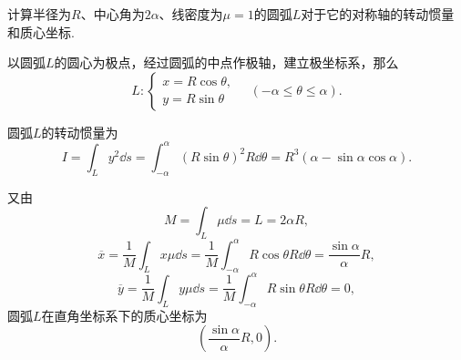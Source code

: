 \begin{example}
计算半径为\(R\)、中心角为\(2\alpha\)、线密度为\(\mu=1\)的圆弧\(L\)对于它的对称轴的转动惯量和质心坐标.
\begin{solution}
以圆弧\(L\)的圆心为极点，经过圆弧的中点作极轴，建立极坐标系，那么\begin{equation*}
	L: \left\{ \begin{array}{l}
		x = R\cos\theta, \\
		y = R\sin\theta
	\end{array} \right.
	\quad(-\alpha\leq\theta\leq\alpha).
\end{equation*}

圆弧\(L\)的转动惯量为\begin{equation*}
	I = \int_L y^2 \dd{s}
	= \int_{-\alpha}^\alpha (R\sin\theta)^2 R\dd{\theta}
	= R^3 (\alpha - \sin\alpha \cos\alpha).
\end{equation*}

又由\begin{equation*}
	M = \int_L \mu \dd{s} = L = 2\alpha R,
\end{equation*}\begin{equation*}
	\overline{x}
	= \frac{1}{M} \int_L x \mu \dd{s}
	= \frac{1}{M} \int_{-\alpha}^\alpha R\cos\theta R\dd{\theta}
	= \frac{\sin\alpha}{\alpha}R,
\end{equation*}\begin{equation*}
	\overline{y}
	= \frac{1}{M} \int_L y \mu \dd{s}
	= \frac{1}{M} \int_{-\alpha}^\alpha R\sin\theta R\dd{\theta}
	= 0,
\end{equation*}
圆弧\(L\)在直角坐标系下的质心坐标为\begin{equation*}
	\left(
		\frac{\sin\alpha}{\alpha}R,0
	\right).
\end{equation*}
\end{solution}
\end{example}

